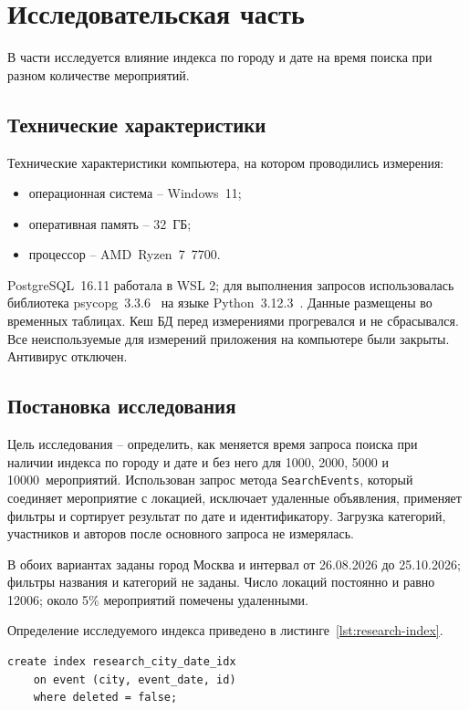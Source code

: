 \chapter{Исследовательская часть}

В части исследуется влияние индекса по городу и дате на время поиска при разном количестве мероприятий.

\section{Технические характеристики}

Технические характеристики компьютера, на котором проводились измерения:
\begin{itemize}
    \item операционная система -- Windows~11;
    \item оперативная память -- 32~ГБ;
    \item процессор -- AMD~Ryzen~7~7700.
\end{itemize}

PostgreSQL~16.11 работала в WSL 2; для выполнения запросов использовалась библиотека psycopg~3.3.6~\cite{psycopg-docs} на языке Python~3.12.3~\cite{python-docs}. Данные размещены во временных таблицах. Кеш БД перед измерениями прогревался и не сбрасывался. Все неиспользуемые для измерений приложения на компьютере были закрыты. Антивирус отключен.

\section{Постановка исследования}

Цель исследования -- определить, как меняется время запроса поиска при наличии индекса по городу и дате и без него для 1000, 2000, 5000 и 10000~мероприятий. Использован запрос метода \texttt{SearchEvents}, который соединяет мероприятие с локацией, исключает удаленные объявления, применяет фильтры и сортирует результат по дате и идентификатору. Загрузка категорий, участников и авторов после основного запроса не измерялась.

В обоих вариантах заданы город Москва и интервал от 26.08.2026 до 25.10.2026; фильтры названия и категорий не заданы. Число локаций постоянно и равно 12006; около 5\% мероприятий помечены удаленными.

Определение исследуемого индекса приведено в листинге~\ref{lst:research-index}.

\begin{lstlisting}[caption={Индекс для исследования поиска},label={lst:research-index}]
create index research_city_date_idx
    on event (city, event_date, id)
    where deleted = false;
\end{lstlisting}

